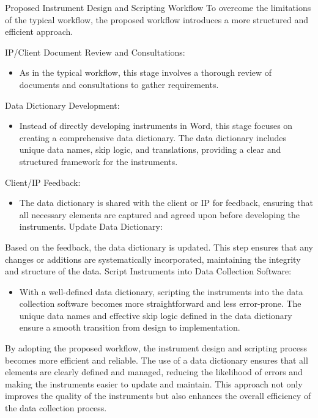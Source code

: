 \documentclass[
  letterpaper,
  DIV=11,
  numbers=noendperiod]{scrreprt}
\providecommand{\tightlist}{%
  \setlength{\itemsep}{0pt}\setlength{\parskip}{0pt}}\usepackage{longtable,booktabs,array}
\begin{document}
Proposed Instrument Design and Scripting Workflow To overcome the
limitations of the typical workflow, the proposed workflow introduces a
more structured and efficient approach.

IP/Client Document Review and Consultations:

\begin{itemize}
\tightlist
\item
  As in the typical workflow, this stage involves a thorough review of
  documents and consultations to gather requirements.
\end{itemize}

Data Dictionary Development:

\begin{itemize}
\tightlist
\item
  Instead of directly developing instruments in Word, this stage focuses
  on creating a comprehensive data dictionary. The data dictionary
  includes unique data names, skip logic, and translations, providing a
  clear and structured framework for the instruments.
\end{itemize}

Client/IP Feedback:

\begin{itemize}
\tightlist
\item
  The data dictionary is shared with the client or IP for feedback,
  ensuring that all necessary elements are captured and agreed upon
  before developing the instruments. Update Data Dictionary:
\end{itemize}

Based on the feedback, the data dictionary is updated. This step ensures
that any changes or additions are systematically incorporated,
maintaining the integrity and structure of the data. Script Instruments
into Data Collection Software:

\begin{itemize}
\tightlist
\item
  With a well-defined data dictionary, scripting the instruments into
  the data collection software becomes more straightforward and less
  error-prone. The unique data names and effective skip logic defined in
  the data dictionary ensure a smooth transition from design to
  implementation.
\end{itemize}

By adopting the proposed workflow, the instrument design and scripting
process becomes more efficient and reliable. The use of a data
dictionary ensures that all elements are clearly defined and managed,
reducing the likelihood of errors and making the instruments easier to
update and maintain. This approach not only improves the quality of the
instruments but also enhances the overall efficiency of the data
collection process.
\end{document}
